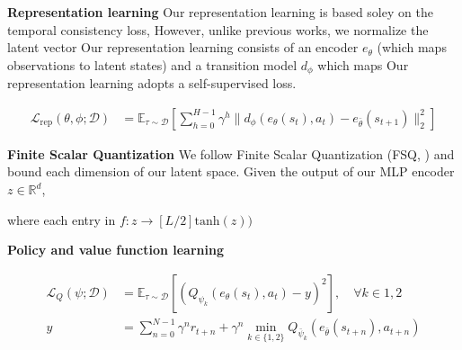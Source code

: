 \documentclass{article}
\theoremstyle{plain}
\theoremstyle{definition}
\theoremstyle{remark}
\newcommand{\E}{\mathbb{E}}
\newcommand{\R}{\mathbb{R}}
\begin{document}
\textbf{Representation learning}
Our representation learning is based soley on the temporal consistency loss,
However, unlike previous works, we normalize the latent vector
Our representation learning consists of an encoder $e_{\theta}$ (which maps observations to
latent states) and a transition model $d_{\phi}$ which maps
Our representation learning adopts a self-supervised loss.

\begin{align} \label{eq:rep-loss}
  \mathcal{L}_{\text{rep}}(\theta, \phi; \mathcal{D})
&= \E_{\tau \sim \mathcal{D}}
\left[ \sum_{h=0}^{H-1} \gamma^{h} \| d_{\phi}(e_{\theta}(s_{t}), a_{t}) - e_{\bar{\theta}}(s_{t+1}) \|_{2}^{2} \right]
\end{align}

\textbf{Finite Scalar Quantization}
We follow Finite Scalar Quantization (FSQ, \cite{mentzerFiniteScalarQuantization2023})
and bound each dimension of our latent space.
Given the output of our MLP encoder $z \in \R^{d}$,

where each entry in  $f : z \rightarrow \left[ L/2 \right] \mathrm{tanh}(z))$



\textbf{Policy and value function learning}

\begin{align} \label{eq:value-loss}
  \mathcal{L}_{Q}(\psi ; \mathcal{D}) &= \E_{\tau \sim \mathcal{D}} \left[ (Q_{\psi_{k}}(e_{\theta}(s_{t}), a_{t}) - y)^{2}  \right], \quad \forall k \in 1, 2 \\
  y &= \sum_{n=0}^{N-1} \gamma^{n} r_{t+n} + \gamma^{n} \min_{k \in \{1,2\}} Q_{\bar{\psi}_{k}}(e_{\bar{\theta}}(s_{t+n}), a_{t+n})
\end{align}
\end{document}
